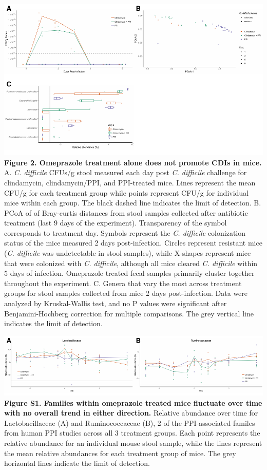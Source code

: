 \documentclass[11pt,]{article}
\begin{document}
\includegraphics{figure_2.pdf} \textbf{Figure 2. Omeprazole treatment
alone does not promote CDIs in mice.} A. \emph{C. difficile} CFUs/g
stool measured each day post \emph{C. difficile} challenge for
clindamycin, clindamycin/PPI, and PPI-treated mice. Lines represent the
mean CFU/g for each treatment group while points represent CFU/g for
individual mice within each group. The black dashed line indicates the
limit of detection. B. PCoA of of Bray-curtis distances from stool
samples collected after antibiotic treatment (last 9 days of the
experiment). Transparency of the symbol corresponds to treatment day.
Symbols represent the \emph{C. difficile} colonization status of the
mice measured 2 days post-infection. Circles represent resistant mice
(\emph{C. difficile} was undetectable in stool samples), while X-shapes
represent mice that were colonized with \emph{C. difficile}, although
all mice cleared \emph{C. difficile} within 5 days of infection.
Omeprazole treated fecal samples primarily cluster together throughout
the experiment. C. Genera that vary the most across treatment groups for
stool samples collected from mice 2 days post-infection. Data were
analyzed by Kruskal-Wallis test, and no P values were significant after
Benjamini-Hochberg correction for multiple comparisons. The grey
vertical line indicates the limit of detection.

\newpage

\includegraphics{figure_s1.pdf} \textbf{Figure S1. Families within
omeprazole treated mice fluctuate over time with no overall trend in
either direction.} Relative abundance over time for Lactobacillaceae (A)
and Ruminococcaceae (B), 2 of the PPI-associated familes from human PPI
studies across all 3 treatment groups. Each point represents the
relative abundance for an individual mouse stool sample, while the lines
represent the mean relative abundances for each treatment group of mice.
The grey horizontal lines indicate the limit of detection.
\end{document}
